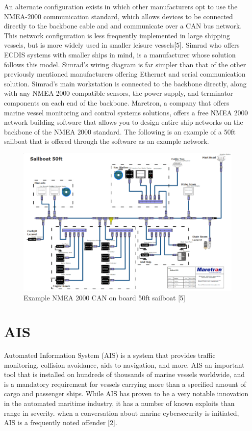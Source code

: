 \documentclass{report}
\begin{document}
\begin{figure}

\end{figure}

An alternate configuration exists in which other manufacturers opt to use the NMEA-2000 communication standard, which allows devices to be connected directly to the backbone cable and and communicate over a CAN bus network. This network configuration is less frequently implemented in large shipping vessels, but is more widely used in smaller leisure vessels[5]. Simrad who offers ECDIS systems with smaller ships in mind, is a manufacturer whose solution follows this model. Simrad's wiring diagram is far simpler than that of the other previously mentioned manufacturers offering Ethernet and serial communication solution. Simrad's main workstation is connected to the backbone directly, along with any NMEA 2000 compatible sensors, the power supply, and terminator components on each end of the backbone. Maretron, a company that offers marine vessel monitoring and control systems solutions, offers a free NMEA 2000 network building software that allows you to design entire ship networks on the backbone of the NMEA 2000 standard. The following is an example of a 50ft sailboat that is offered through the software as an example network.
\begin{figure}[h]
    \centering
    \includegraphics[width=12cm]{Images and Figures/NMEA2K.png}
    \caption{Example NMEA 2000 CAN on board 50ft sailboat   [5]}
    \label{fig:NMEA CAN}
\end{figure}







\section{AIS}
Automated Information System (AIS) is a system that provides traffic monitoring, collision avoidance, aids to navigation, and more. AIS an important tool that is installed on hundreds of thousands of marine vessels worldwide, and is a mandatory requirement for vessels carrying more than a specified amount of cargo and passenger ships. While AIS has proven to be a very notable innovation in the automated maritime industry, it has a number of known exploits than range in severity. when a conversation about marine cybersecurity is initiated, AIS is a frequently noted offender [2]. 
\end{document}
